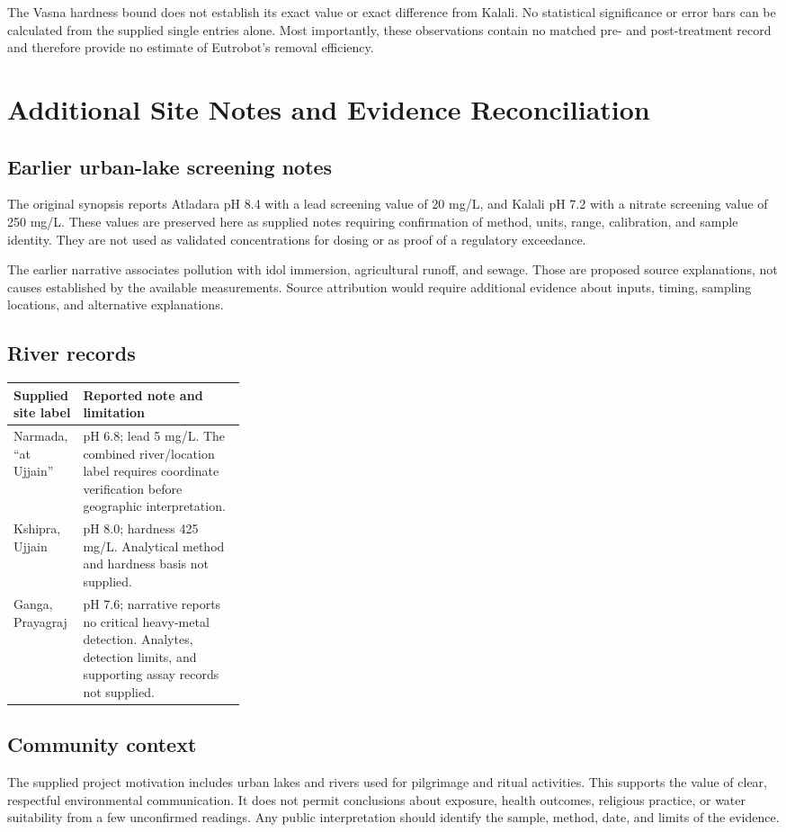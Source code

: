 \documentclass[12pt,a4paper]{article}
\newcommand{\papersection}[1]{\clearpage\section{#1}}
\begin{document}
The Vasna hardness bound does not establish its exact value or exact difference from Kalali. No statistical significance or error bars can be calculated from the supplied single entries alone. Most importantly, these observations contain no matched pre- and post-treatment record and therefore provide no estimate of Eutrobot's removal efficiency.

\papersection{Additional Site Notes and Evidence Reconciliation}
\subsection{Earlier urban-lake screening notes}
The original synopsis reports Atladara pH 8.4 with a lead screening value of 20 mg/L, and Kalali pH 7.2 with a nitrate screening value of 250 mg/L. These values are preserved here as supplied notes requiring confirmation of method, units, range, calibration, and sample identity. They are not used as validated concentrations for dosing or as proof of a regulatory exceedance.

The earlier narrative associates pollution with idol immersion, agricultural runoff, and sewage. Those are proposed source explanations, not causes established by the available measurements. Source attribution would require additional evidence about inputs, timing, sampling locations, and alternative explanations.

\subsection{River records}
\begin{center}\small
\begin{tabularx}{\linewidth}{@{}p{0.30\linewidth}Y@{}}
\toprule Supplied site label & Reported note and limitation\\\midrule
Narmada, ``at Ujjain'' & pH 6.8; lead 5 mg/L. The combined river/location label requires coordinate verification before geographic interpretation.\\
Kshipra, Ujjain & pH 8.0; hardness 425 mg/L. Analytical method and hardness basis not supplied.\\
Ganga, Prayagraj & pH 7.6; narrative reports no critical heavy-metal detection. Analytes, detection limits, and supporting assay records not supplied.\\
\bottomrule
\end{tabularx}\end{center}

\subsection{Community context}
The supplied project motivation includes urban lakes and rivers used for pilgrimage and ritual activities. This supports the value of clear, respectful environmental communication. It does not permit conclusions about exposure, health outcomes, religious practice, or water suitability from a few unconfirmed readings. Any public interpretation should identify the sample, method, date, and limits of the evidence.
\end{document}
